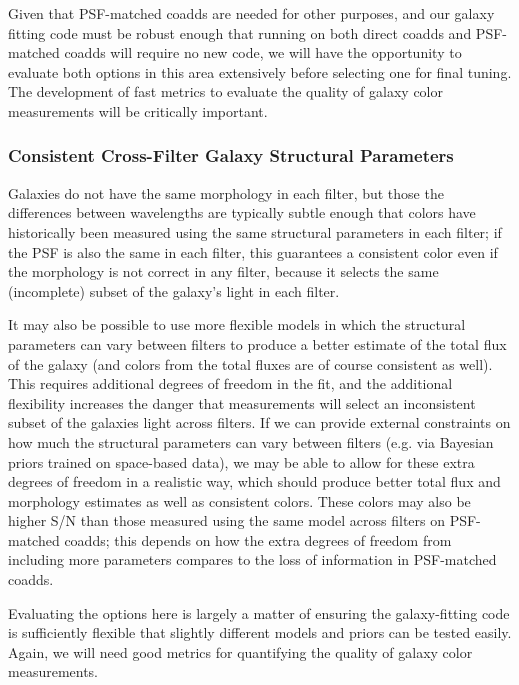 \documentclass[10pt]{article}
\begin{document}
Given that PSF-matched coadds are needed for other purposes, and our galaxy
fitting code must be robust enough that running on both direct coadds and
PSF-matched coadds will require no new code, we will have the opportunity
to evaluate both options in this area extensively before selecting one for
final tuning.  The development of fast metrics to evaluate the quality of
galaxy color measurements will be critically important.

\subsubsection{Consistent Cross-Filter Galaxy Structural Parameters}

\label{sec:consistent-galaxy-colors}

Galaxies do not have the same morphology in each filter, but those the
differences between wavelengths are typically subtle enough that colors have
historically been measured using the same structural parameters in each
filter; if the PSF is also the same in each filter, this guarantees a
consistent color even if the morphology is not correct in any filter, because
it selects the same (incomplete) subset of the galaxy's light in each filter.

It may also be possible to use more flexible models in which the structural
parameters can vary between filters to produce a better estimate of the total
flux of the galaxy (and colors from the total fluxes are of course consistent
as well).  This requires additional degrees of freedom in the fit, and the
additional flexibility increases the danger that measurements will select an
inconsistent subset of the galaxies light across filters.  If we can provide
external constraints on how much the structural parameters can vary between
filters (e.g. via Bayesian priors trained on space-based data), we may be able
to allow for these extra degrees of freedom in a realistic way, which should
produce better total flux and morphology estimates as well as consistent
colors.  These colors may also be higher S/N than those measured using the
same model across filters on PSF-matched coadds; this depends on how
the extra degrees of freedom from including more parameters compares to the
loss of information in PSF-matched coadds.

Evaluating the options here is largely a matter of ensuring the galaxy-fitting
code is sufficiently flexible that slightly different models and priors can
be tested easily.  Again, we will need good metrics for quantifying the
quality of galaxy color measurements.
\end{document}
